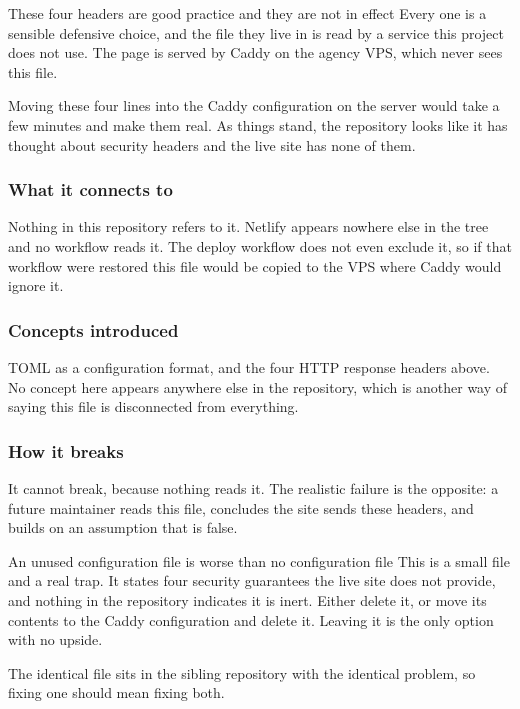 \begin{keyidea}{These four headers are good practice and they are not in effect}
Every one is a sensible defensive choice, and the file they live in is read by a
service this project does not use. The page is served by Caddy on the agency VPS,
which never sees this file.

Moving these four lines into the Caddy configuration on the server would take a few
minutes and make them real. As things stand, the repository looks like it has
thought about security headers and the live site has none of them.
\end{keyidea}

\subsubsection*{What it connects to}

Nothing in this repository refers to it. Netlify appears nowhere else in the tree
and no workflow reads it. The deploy workflow does not even exclude it, so if that
workflow were restored this file would be copied to the VPS where Caddy would
ignore it.

\subsubsection*{Concepts introduced}

TOML as a configuration format, and the four HTTP response headers above. No
concept here appears anywhere else in the repository, which is another way of
saying this file is disconnected from everything.

\subsubsection*{How it breaks}

It cannot break, because nothing reads it. The realistic failure is the opposite: a
future maintainer reads this file, concludes the site sends these headers, and
builds on an assumption that is false.

\begin{honest}{An unused configuration file is worse than no configuration file}
This is a small file and a real trap. It states four security guarantees the live
site does not provide, and nothing in the repository indicates it is inert. Either
delete it, or move its contents to the Caddy configuration and delete it. Leaving it
is the only option with no upside.

The identical file sits in the sibling repository with the identical problem, so
fixing one should mean fixing both.
\end{honest}
